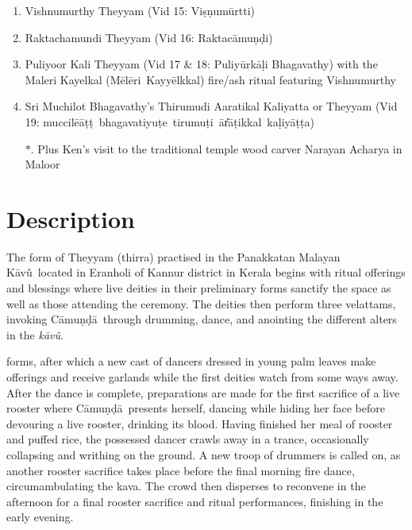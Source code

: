 \documentclass[a4paper, 11pt]{article} %
\newcommand{\camunda}[0]{C\={a}mu\d{n}\d{d}\={a}}
\newcommand{\kavu}[0]{\textit{k\={a}v\^{u}}}
\newcommand{\Kavu}[0]{K\={a}v\^{u}}
\newcommand{\visnumurtti}[0]{Vi\d{s}\d{n}um\={u}rtti}
\newcommand{\raktacamundi}[0]{Raktac\={a}mu\d{n}\d{d}i}
\newcommand{\meleri}[0]{M\={e}l\={e}ri}
\newcommand{\kayyelkkal}[0]{Kayy\={e}lkkal}
\newcommand{\muccileatt}[0]{muccil\={e}\={a}\d{t}\d{t}}
\newcommand{\bhagavatiyute}[0]{bhagavatiyu\d{t}e}
\newcommand{\tirumuti}[0]{tirumu\d{t}i}
\newcommand{\aratikkal}[0]{\={a}\U{r}\={a}\d{t}ikkal}
\newcommand{\kaliyatta}[0]{ka\d{l}iy\={a}\d{t}\d{t}a}
\begin{document}
\begin{enumerate}
\item Vishnumurthy Theyyam (Vid 15: \visnumurtti) 
\item Raktachamundi Theyyam (Vid 16: \raktacamundi) 
\item Puliyoor Kali Theyyam (Vid 17 \& 18: Puliy\={u}rk\={a}\d{l}i Bhagavathy) with the Maleri Kayelkal (\meleri\ \kayyelkkal) fire/ash ritual featuring Vishnumurthy
\item Sri Muchilot Bhagavathy's Thirumudi Aaratikal Kaliyatta or Theyyam (Vid 19: \muccileatt\ \bhagavatiyute\ \tirumuti\ \aratikkal\ \kaliyatta)
\item[$*$.] Plus Ken's visit to the traditional temple wood carver Narayan Acharya in Maloor
\end{enumerate}




\section{Description}%
  \label{sec:Description}
  
The form of Theyyam (thirra) practised in the Panakkatan Malayan \Kavu\ located in Eranholi of Kannur district in Kerala begins with ritual offerings and blessings where live deities in their preliminary forms sanctify the space as well as those attending the ceremony.
The deities then perform three velattams, invoking \camunda\ through drumming, dance, and anointing the different alters in the \kavu.

forms, after which a new cast of dancers dressed in young palm leaves make offerings and receive garlands while the first deities watch from some ways away.
After the dance is complete, preparations are made for the first sacrifice of a live rooster where \camunda\ presents herself, dancing while hiding her face before devouring a live rooster, drinking its blood.
Having finished her meal of rooster and puffed rice, the possessed dancer crawls away in a trance, occasionally collapsing and writhing on the ground. 
A new troop of drummers is called on, as another rooster sacrifice takes place before the final morning fire dance, circumambulating the kava.
The crowd then disperses to reconvene in the afternoon for a final rooster sacrifice and ritual performances, finishing in the early evening.
\end{document}

